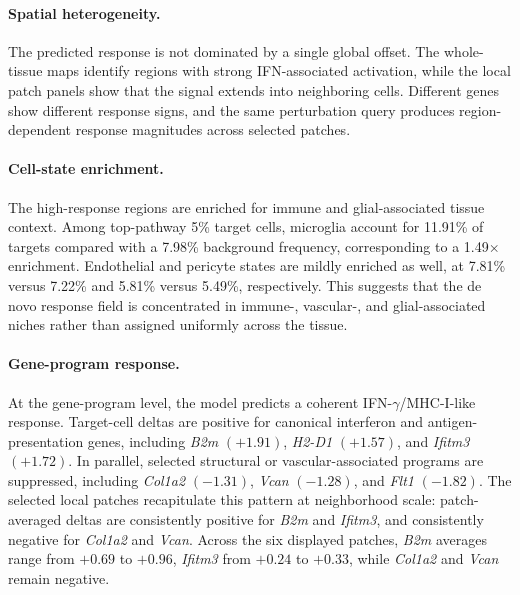 \documentclass[sigconf,review,balance=false]{acmart}
\begin{document}
\paragraph{Spatial heterogeneity.}
The predicted response is not dominated by a single global offset. The whole-tissue maps identify regions with strong IFN-associated activation, while the local patch panels show that the signal extends into neighboring cells. Different genes show different response signs, and the same perturbation query produces region-dependent response magnitudes across selected patches.

\paragraph{Cell-state enrichment.}
The high-response regions are enriched for immune and glial-associated tissue context. Among top-pathway 5\% target cells, microglia account for 11.91\% of targets compared with a 7.98\% background frequency, corresponding to a 1.49$\times$ enrichment. Endothelial and pericyte states are mildly enriched as well, at 7.81\% versus 7.22\% and 5.81\% versus 5.49\%, respectively. This suggests that the de novo response field is concentrated in immune-, vascular-, and glial-associated niches rather than assigned uniformly across the tissue.

\paragraph{Gene-program response.}
At the gene-program level, the model predicts a coherent IFN-$\gamma$/MHC-I-like response. Target-cell deltas are positive for canonical interferon and antigen-presentation genes, including \textit{B2m} $(+1.91)$, \textit{H2-D1} $(+1.57)$, and \textit{Ifitm3} $(+1.72)$. In parallel, selected structural or vascular-associated programs are suppressed, including \textit{Col1a2} $(-1.31)$, \textit{Vcan} $(-1.28)$, and \textit{Flt1} $(-1.82)$. The selected local patches recapitulate this pattern at neighborhood scale: patch-averaged deltas are consistently positive for \textit{B2m} and \textit{Ifitm3}, and consistently negative for \textit{Col1a2} and \textit{Vcan}. Across the six displayed patches, \textit{B2m} averages range from $+0.69$ to $+0.96$, \textit{Ifitm3} from $+0.24$ to $+0.33$, while \textit{Col1a2} and \textit{Vcan} remain negative.
\end{document}
